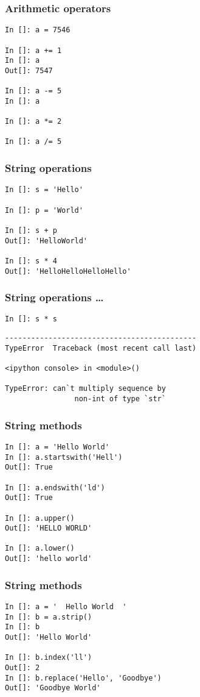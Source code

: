 \documentclass[14pt,compress]{beamer}
\begin{document}
\begin{frame}[fragile]
  \frametitle{Arithmetic operators}
  \begin{lstlisting}
In []: a = 7546

In []: a += 1
In []: a
Out[]: 7547

In []: a -= 5
In []: a

In []: a *= 2

In []: a /= 5
  \end{lstlisting}
\end{frame}


\begin{frame}[fragile]
  \frametitle{String operations}
  \begin{lstlisting}
In []: s = 'Hello'

In []: p = 'World'

In []: s + p
Out[]: 'HelloWorld'

In []: s * 4
Out[]: 'HelloHelloHelloHello'
  \end{lstlisting}
\end{frame}

\begin{frame}[fragile]
  \frametitle{String operations \ldots}
  \begin{lstlisting}
In []: s * s
  \end{lstlisting}
  \pause
  \begin{lstlisting}
--------------------------------------------
TypeError  Traceback (most recent call last)

<ipython console> in <module>()

TypeError: can`t multiply sequence by
                non-int of type `str`
  \end{lstlisting}
\end{frame}

\begin{frame}[fragile]
  \frametitle{String methods}
  \begin{lstlisting}
In []: a = 'Hello World'
In []: a.startswith('Hell')
Out[]: True

In []: a.endswith('ld')
Out[]: True

In []: a.upper()
Out[]: 'HELLO WORLD'

In []: a.lower()
Out[]: 'hello world'
  \end{lstlisting}
\end{frame}

\begin{frame}[fragile]
  \frametitle{String methods}
  \begin{lstlisting}
In []: a = '  Hello World  '
In []: b = a.strip()
In []: b
Out[]: 'Hello World'

In []: b.index('ll')
Out[]: 2
In []: b.replace('Hello', 'Goodbye')
Out[]: 'Goodbye World'
\end{lstlisting}
\end{frame}
\end{document}
